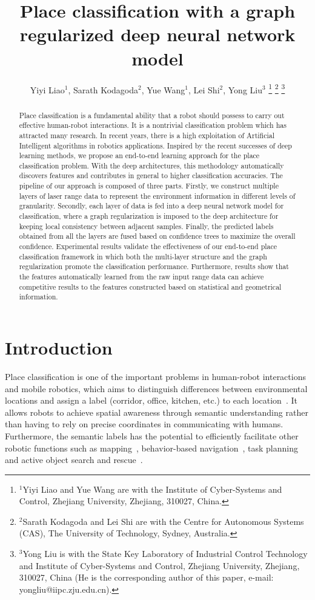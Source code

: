 \documentclass[letterpaper, 10 pt, conference]{ieeeconf}  %
\title{\LARGE \bf
Place classification with a graph regularized deep neural network model
}
\author{Yiyi Liao$^{1}$, Sarath Kodagoda$^{2}$, Yue Wang$^{1}$, Lei Shi$^{2}$, Yong Liu$^{3}$ %
\thanks{$^{1}$Yiyi Liao and Yue Wang are with the Institute of Cyber-Systems and Control, Zhejiang University, Zhejiang, 310027, China.}
\thanks{$^{2}$Sarath Kodagoda and Lei Shi are with the Centre for Autonomous Systems (CAS), The University of Technology, Sydney, Australia.}
\thanks{$^{3}$Yong Liu is with the State Key Laboratory of Industrial Control Technology and Institute of Cyber-Systems and Control, Zhejiang University, Zhejiang, 310027, China (He is the corresponding author of this paper, e-mail: \small  yongliu@iipc.zju.edu.cn).}}
\begin{document}
\maketitle
\thispagestyle{empty}
\pagestyle{empty}


\begin{abstract}
Place classification is a fundamental ability that a robot should possess to carry out effective human-robot interactions. It is a nontrivial classification problem which has attracted many research. In recent years, there is a high exploitation of Artificial Intelligent algorithms in robotics applications. Inspired by the recent successes of deep learning methods, we propose an end-to-end learning approach for the place classification problem. With the deep architectures, this methodology automatically discovers features and contributes in general to higher classification accuracies. The pipeline of our approach is composed of three parts. Firstly, we construct multiple layers of laser range data to represent the environment information in different levels of granularity. Secondly, each layer of data is fed into a deep neural network model for classification, where a graph regularization is imposed to the deep architecture for keeping local consistency between adjacent samples. Finally, the predicted labels obtained from all the layers are fused based on confidence trees to maximize the overall confidence. Experimental results validate the effectiveness of our end-to-end place classification framework in which both the multi-layer structure and the graph regularization promote the classification performance. Furthermore, results show that the features automatically learned from the raw input range data can achieve competitive results to the features constructed based on statistical and geometrical information.


\end{abstract}


\section{Introduction}

Place classification is one of the important problems in human-robot interactions and mobile robotics, which aims to distinguish differences between environmental locations and assign a label (corridor, office, kitchen, etc.) to each location~\cite{yuan2011robust,pronobis2011hierarchical}. It allows robots to achieve spatial awareness through semantic understanding rather than having to rely on precise coordinates in communicating with humans. Furthermore, the semantic labels has the potential to efficiently facilitate other robotic functions such as mapping~\cite{ranganathan2011visual}, behavior-based navigation~\cite{poncela2008place}, task planning~\cite{galindo2008robot} and active object search and rescue~\cite{aydemir2011search}.
\end{document}
